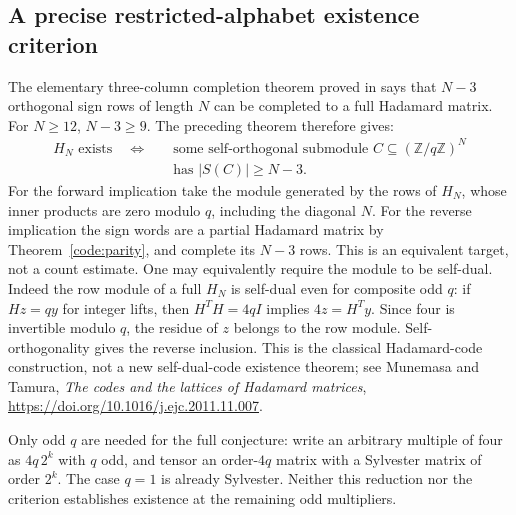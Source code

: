 \documentclass[11pt]{article}
\begin{document}
\subsection{A precise restricted-alphabet existence criterion}
The elementary three-column completion theorem proved in
 says that $N-3$ orthogonal
sign rows of length $N$ can be completed to a full Hadamard matrix.
For $N\ge12$, $N-3\ge9$. The preceding theorem therefore gives:
\[
 \begin{split}
 H_N\text{ exists}\quad\Longleftrightarrow\quad&
 \text{some self-orthogonal submodule }C\subseteq
 (\mathbb Z/q\mathbb Z)^N\\[-2pt]
 &\text{has }|S(C)|\ge N-3.
 \end{split}
\]
For the forward implication take the module generated by the rows
of $H_N$, whose inner products are zero modulo $q$, including the
diagonal $N$. For the reverse implication the sign words are a
partial Hadamard matrix by Theorem~\ref{code:parity}, and complete
its $N-3$ rows. This is an equivalent target, not a count estimate.
One may equivalently require the module to be self-dual. Indeed the
row module of a full $H_N$ is self-dual even for composite odd $q$:
if $Hz=qy$ for integer lifts, then $H^TH=4qI$ implies
$4z=H^Ty$. Since four is invertible modulo $q$, the residue of
$z$ belongs to the row module. Self-orthogonality gives the reverse
inclusion. This is the classical Hadamard-code construction, not
a new self-dual-code existence theorem; see Munemasa and Tamura,
\emph{The codes and the lattices of Hadamard matrices},
\url{https://doi.org/10.1016/j.ejc.2011.11.007}.

Only odd $q$ are needed for the full conjecture: write an arbitrary
multiple of four as $4q\,2^k$ with $q$ odd, and tensor an order-$4q$
matrix with a Sylvester matrix of order $2^k$. The case $q=1$
is already Sylvester. Neither this reduction nor the criterion
establishes existence at the remaining odd multipliers.
\end{document}
